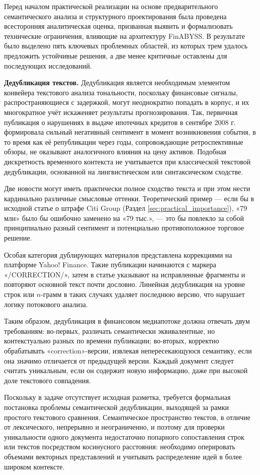 Перед началом практической реализации на основе предварительного семантического анализа и
структурного проектирования была проведена всесторонняя аналитическая оценка, призванная
выявить и формализовать технические ограничения, влияющие на архитектуру FinABYSS. В результате
было выделено пять ключевых проблемных областей, из которых трем удалось предложить устойчивые
решения, а две менее критичные оставлены для последующих исследований.

\textbf{Дедубликация текстов.} Дедубликация является необходимым элементом конвейера
текстового анализа тональности, поскольку финансовые сигналы, распространяющиеся с задержкой,
могут неоднократно попадать в корпус, и их многократное учёт искаженяет результаты
прогнозирования. Так, первичная публикация о нарушениях в выдаче ипотечных кредитов
в сентябре 2008 г. формировала сильный негативный сентимент в момент возникновения события,
в то время как её републикации через годы, сопровождающие ретроспективные обзоры, не оказывают
аналогичного влияния на цену активов. Подобная дискретность временного контекста не учитывается
при классической текстовой дедубликации, основанной на лингвистическом или синтаксическом сходстве.

Две новости могут иметь практически полное сходство текста и при этом нести кардинально различные
смысловые оттенки. Теоретический пример --- если бы в исходной статье о штрафе Citi Group
(Раздел \ref{sec:practical_importance}), «79 млн» было бы ошибочно заменено на «79 тыс.», --- это бы
повлекло за собой принципиально разный сентимент и потенциально противоположное торговое решение.

Особая категория дублирующих материалов представлена коррекциями на платформе Yahoo! Finance. Такие
публикации начинаются с маркера «/CORRECTION/», затем в статье указывают на исправленные фрагменты и
повторяют основной текст почти дословно. Линейная дедубликация на уровне строк или $n$-грамм в таких
случаях удаляет последнюю версию, что нарушает логику потокового анализа.

Таким образом, дедубликация в финансовом медиапотоке должна отвечать двум требованиям: во-первых,
различать семантически эквивалентные, но контекстуально разных по времени публикации; во-вторых,
корректно обрабатывать «correction»-версии, извлекая непересекающуюся семантику, если она значимо
отличается от предыдущей версии. Каждый документ следует считать уникальным, если он содержит новую
информацию, даже при высокой доле текстового совпадения.

Поскольку в задаче отсутствует исходная разметка, требуется формальная постановка проблемы семантической
дедубликации, выходящей за рамки простого текстового сравнения. Семантическое пространство текстов,
в отличие от лексического, непрерывно и неограниченно, и поэтому для проверки уникальности одного
документа недостаточно попарного сопоставления строк или текстов посредством косинусного расстояния:
необходимо оперировать объемами векторных представлений и учитывать распределение идей в более широком
контексте.

